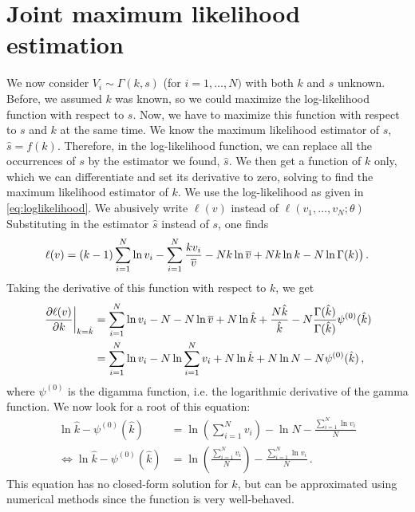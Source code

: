 \documentclass[final]{aomart}
\newtheorem[{}\it]{thm}{Theorem}[section]
\theoremstyle{definition}
\newtheorem*[{}\it]{notation}{Notation}
\numberwithin{equation}{section}
\newcommand{\dig}{\psi^{(0)}}
\newcommand{\eval}[2][\right]{\relax
  \ifx#1\right\relax \left.\fi#2#1\rvert}
\begin{document}
\section{Joint maximum likelihood estimation}
We now consider \(V_i \sim \Gamma(k, s)\) (for \(i = 1,\ldots,N)\) with both \(k\) and \(s\) unknown.
Before, we assumed \(k\) was known, so we could maximize the log-likelihood function with respect to \(s\).
Now, we have to maximize this function with respect to \(s\) and \(k\) at the same time.
We know the maximum likelihood estimator of \(s\), \(\hat{s} = f(k)\).
Therefore, in the log-likelihood function, we can replace all the occurrences of \(s\) by the estimator we found, \(\hat{s}\).
We then get a function of \(k\) only, which we can differentiate  and set its derivative to zero, solving to find the maximum likelihood estimator of \(k\).
We use the log-likelihood as given in \eqref{eq:loglikelihood}.
We abusively write \(\ell(v)\) instead of \(\ell(v_1, \ldots, v_N; \theta)\)
Substituting in the estimator \(\hat{s}\) instead of \(s\), one finds
\begin{align}
\ell(v) = (k-1) \sum_{i=1}^{N}\ln v_i - \sum_{i=1}^{N} \frac{kv_i}{\overline{v}} - N k \ln \overline{v} + N k \ln k - N \ln \Gamma(k)\big)\,.
\end{align}
Taking the derivative of this function with respect to \(k\), we get
\begin{align}
\eval{\frac{\partial \ell(v)}{\partial k}}_{k = \hat{k}} &= \sum_{i=1}^N \ln v_i - N - N \ln \widebar{v} + N \ln \hat{k} + \frac{N\hat{k}}{\hat{k}} - N\frac{\Gamma(\hat{k})}{\Gamma(\hat{k})}\dig(\hat{k})\\
&= \sum_{i=1}^N \ln v_i - N \ln \sum_{i=1}^N v_i + N \ln \hat{k}  + N \ln N - N \dig(\hat{k})\,,
\end{align}
where \(\dig\) is the digamma function, i.e. the logarithmic derivative of the gamma function.
We now look for a root of this equation:
\begin{align}
\ln \hat{k} - \dig(\hat{k}) &= \ln \left(\sum_{i=1}^N v_i\right) - \ln N - \frac{\sum_{i=1}^N \ln v_i}{N}\\
\iff \ln \hat{k}  - \dig(\hat{k}) &= \ln \left(\frac{\sum_{i=1}^N v_i}{N}\right) - \frac{\sum_{i=1}^N \ln v_i}{N}\,.
\end{align}
This equation has no closed-form solution for \(k\), but can be approximated using numerical methods since the function is very well-behaved.
\end{document}
